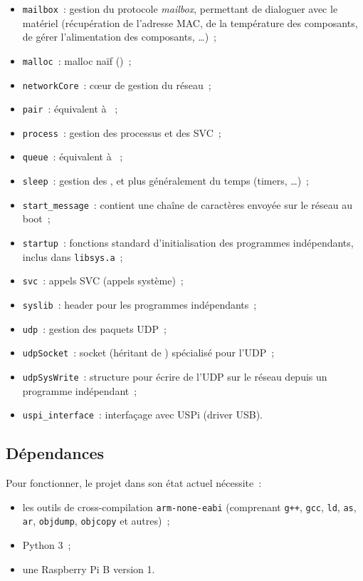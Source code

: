 \documentclass[11pt,a4paper]{article}
\newcommand{\fname}[1]{\texttt{#1}} %
\begin{document}
\begin{itemize}
	\item \fname{mailbox}~: gestion du protocole \textit{mailbox}, permettant
		de dialoguer avec le matériel (récupération de l'adresse MAC, 
		de la température des composants, de gérer l'alimentation des
		composants, \ldots)~;
	\item \fname{malloc}~: malloc naïf ()~;
	\item \fname{networkCore}~: cœur de gestion du réseau~;
	\item \fname{pair}~: équivalent à ~;
	\item \fname{process}~: gestion des processus et des SVC~;
	\item \fname{queue}~: équivalent à ~;
	\item \fname{sleep}~: gestion des , et plus généralement
		du temps (timers, \ldots)~;
	\item \fname{start\_message}~: contient une chaîne de caractères envoyée
		sur le réseau au boot~;
	\item \fname{startup}~: fonctions standard d'initialisation des programmes
		indépendants, inclus dans \fname{libsys.a}~;
	\item \fname{svc}~: appels SVC (appels système)~;
	\item \fname{syslib}~: header pour les programmes indépendants~;
	\item \fname{udp}~: gestion des paquets UDP~;
	\item \fname{udpSocket}~: socket (héritant de )
		spécialisé pour l'UDP~;
	\item \fname{udpSysWrite}~: structure pour écrire de l'UDP sur le
		réseau depuis un programme indépendant~;
	\item \fname{uspi\_interface}~: interfaçage avec USPi (driver USB).
\end{itemize}

\subsection{Dépendances}

Pour fonctionner, le projet dans son état actuel nécessite~:
\begin{itemize}
	\item les outils de cross-compilation \texttt{arm-none-eabi} (comprenant
		\fname{g++}, \fname{gcc}, \fname{ld}, \fname{as}, \fname{ar},
		\fname{objdump}, \fname{objcopy} et autres)~;
	\item Python 3~;
	\item une Raspberry Pi B version 1.
\end{itemize}
\end{document}
